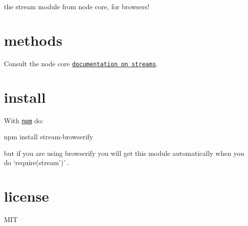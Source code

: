 the stream module from node core, for browsers!

\href{http://travis-ci.org/substack/stream-browserify}{\tt }

\section*{methods}

Consult the node core \href{http://nodejs.org/docs/latest/api/stream.html}{\tt documentation on streams}.

\section*{install}

With \href{https://npmjs.org}{\tt npm} do\+:


\begin{DoxyCode}
npm install stream-browserify
\end{DoxyCode}


but if you are using browserify you will get this module automatically when you do `require(\textquotesingle{}stream')\`{}.

\section*{license}

M\+IT 